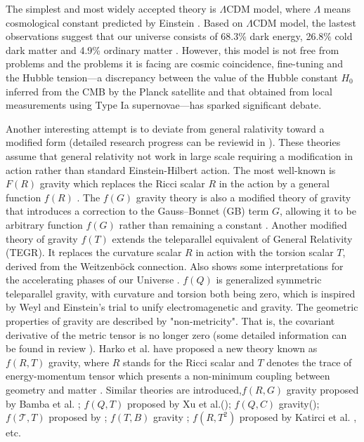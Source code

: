 \documentclass[a4paper,fleqn]{cas-sc}
\begin{document}
The simplest and most widely accepted theory is $\Lambda \text{CDM}$ model, where $\Lambda$ means cosmological constant predicted by Einstein \cite{Carroll_2001}.
Based on $\Lambda \text{CDM}$ model, the lastest observations suggest that our universe consists of 68.3\% dark energy, 26.8\% cold dark matter and 4.9\% ordinary matter \cite{2020Planck}. However, this model is not free from problems and the problems it is facing are cosmic coincidence, fine-tuning and the Hubble tension—a discrepancy between the value of the Hubble constant $H_0$ inferred from the CMB by the Planck satellite and that obtained from local measurements using Type Ia supernovae—has sparked significant debate. 

Another interesting attempt is to deviate from general ralativity toward a modified form (detailed research progress can be reviewid in \cite{Clifton_2012}). These theories assume that general relativity not work in large scale requiring a modification in action rather than standard Einstein-Hilbert action. The most well-known is $F(R)$ gravity which replaces the Ricci scalar $R$ in the action by a general function $f(R)$ \cite{1970MNRAS.150....1B}. The $f(G)$ gravity theory is also a modified theory of gravity that introduces a correction to the Gauss–Bonnet (GB) term $G$, allowing it to be arbitrary function $f(G)$ rather than remaining a constant \cite{NOJIRI20051,NOJIRI_2007}. Another modified theory of gravity $f(T)$ extends the teleparallel equivalent of General Relativity (TEGR). It replaces the curvature scalar $R$ in action with the torsion scalar $T$, derived from the Weitzenböck connection. Also shows some interpretations for the accelerating phases of our Universe \cite{Cai_2016,Bengochea_2009}. $f(Q)$ is generalized symmetric teleparallel gravity, with curvature and torsion both being zero, which is inspired by Weyl and Einstein's trial to unify electromagenetic and gravity. The geometric properties of gravity are described by "non-metricity". That is, the covariant derivative of the metric tensor is no longer zero (some detailed information can be found in review \cite{HEISENBERG20241}). Harko et al. have proposed a new theory known as $f (R, T )$ gravity, where $R$ stands for the Ricci scalar and $T$ denotes the trace of energy-momentum tensor which presents a non-minimum coupling between geometry and matter \cite{PhysRevD.84.024020}. Similar theories are introduced,$f(R,G)$ gravity proposed by Bamba et al. \cite{Bamba2009FinitetimeFS}; $f(Q,T)$ proposed by Xu et al.(\cite{Xu_2019}); $f(Q,C)$ gravity(\cite{De_2024}); $f(\mathcal{T},T)$ proposed by \cite{Harko_2014}; $f(T,B)$ gravity \cite{Bahamonde_2015,Bahamonde_2017}; $f(R,T^2)$ proposed by Katirci et al. \cite{Kat_rc__2014}, etc.
\end{document}
